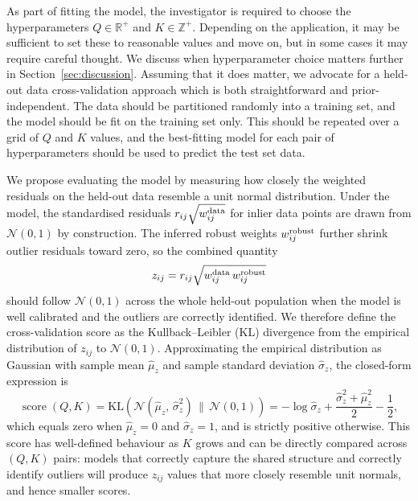 \documentclass[onecolumn,floatfix,linenumbers,trackchanges]{aastex631}
\DeclareMathOperator*{\score}{score}
\newcommand{\tom}[1]{\textcolor{teal}{\textbf{TH says:} #1}}
\begin{document}
As part of fitting the model, the investigator is required to choose the hyperparameters $Q\in \mathbb{R}^+$ and $K\in \mathbb{Z}^+$.
Depending on the application, it may be sufficient to set these to reasonable values and move on, but in some cases it may require careful thought.
We discuss when hyperparameter choice matters further in Section~\ref{sec:discussion}.
Assuming that it does matter, we advocate for a held-out data cross-validation approach which is both straightforward and prior-independent.
The data should be partitioned randomly into a training set, and the model should be fit on the training set only.
This should be repeated over a grid of $Q$ and $K$ values, and the best-fitting model for each pair of hyperparameters should be used to predict the test set data.

We propose evaluating the model by measuring how closely the weighted residuals on the held-out data resemble a unit normal distribution.
Under the model, the standardised residuals $r_{ij}\sqrt{w^{\rm data}_{ij}}$ for inlier data points are drawn from $\mathcal{N}(0,1)$ by construction.
The inferred robust weights $w^{\rm robust}_{ij}$ further shrink outlier residuals toward zero, so the combined quantity
\begin{equation}
    z_{ij} = r_{ij}\sqrt{w^{\rm data}_{ij}\,w^{\rm robust}_{ij}}
\end{equation}
should follow $\mathcal{N}(0,1)$ across the whole held-out population when the model is well calibrated and the outliers are correctly identified.
We therefore define the cross-validation score as the Kullback--Leibler (KL) divergence \citep{kullback1951} from the empirical distribution of $z_{ij}$ to $\mathcal{N}(0,1)$.
Approximating the empirical distribution as Gaussian with sample mean $\hat{\mu}_z$ and sample standard deviation $\hat{\sigma}_z$, the closed-form expression is
\begin{equation}
    \score(Q,K) = \mathrm{KL}\!\left(\mathcal{N}(\hat{\mu}_z,\,\hat{\sigma}_z^2)\,\Big\|\,\mathcal{N}(0,1)\right) = -\log\hat{\sigma}_z + \frac{\hat{\sigma}_z^2 + \hat{\mu}_z^2}{2} - \frac{1}{2}, \label{eq:score}
\end{equation}
which equals zero when $\hat{\mu}_z = 0$ and $\hat{\sigma}_z = 1$, and is strictly positive otherwise.
This score has well-defined behaviour as $K$ grows and can be directly compared across $(Q,K)$ pairs: models that correctly capture the shared structure and correctly identify outliers will produce $z_{ij}$ values that more closely resemble unit normals, and hence smaller scores.
\end{document}
